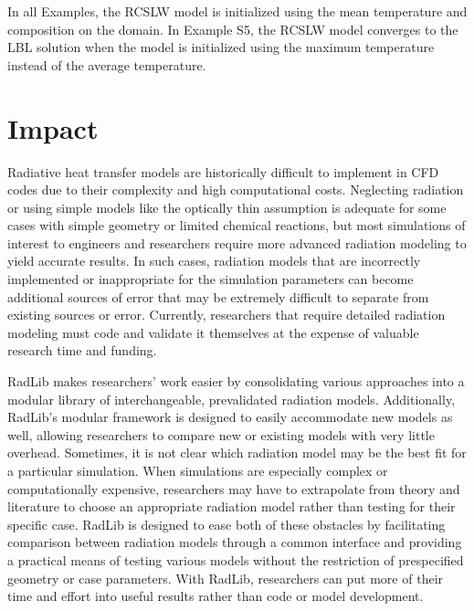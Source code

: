 \documentclass[preprint,12pt, a4paper]{elsarticle}
\begin{document}
In all Examples, the RCSLW model is initialized using the mean temperature and composition on the domain. In Example S5, the RCSLW model converges to the LBL solution when the model is initialized using the maximum temperature instead of the average temperature.



\section{Impact} \label{s:impact}

Radiative heat transfer models are historically difficult to implement in CFD codes due to their complexity and high computational costs. Neglecting radiation or using simple models like the optically thin assumption is adequate for some cases with simple geometry or limited chemical reactions, but most simulations of interest to engineers and researchers require more advanced radiation modeling to yield accurate results. In such cases, radiation models that are incorrectly implemented or inappropriate for the simulation parameters can become additional sources of error that may be extremely difficult to separate from existing sources or error. Currently, researchers that require detailed radiation modeling must code and validate it themselves at the expense of valuable research time and funding. 

RadLib makes researchers' work easier by consolidating various approaches into a modular library of interchangeable, prevalidated radiation models. Additionally, RadLib's modular framework is designed to easily accommodate new models as well, allowing researchers to compare new or existing models with very little overhead. Sometimes, it is not clear which radiation model may be the best fit for a particular simulation. When simulations are especially complex or computationally expensive, researchers may have to extrapolate from theory and literature to choose an appropriate radiation model rather than testing for their specific case. RadLib is designed to ease both of these obstacles by facilitating comparison between radiation models through a common interface and providing a practical means of testing various models without the restriction of prespecified geometry or case parameters. With RadLib, researchers can put more of their time and effort into useful results rather than code or model development. 
\end{document}
